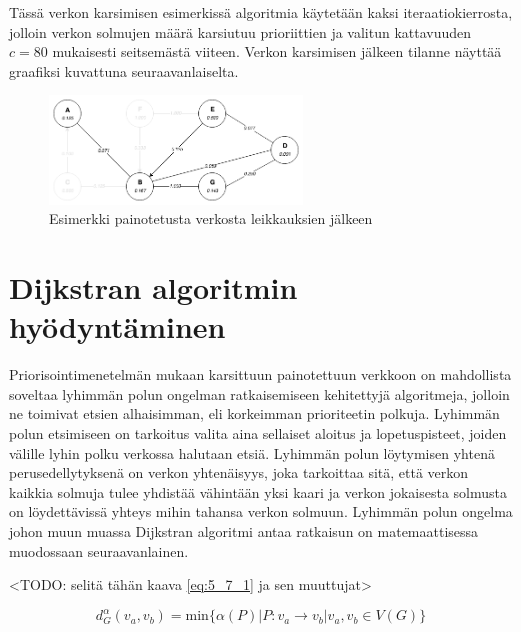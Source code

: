  Tässä verkon karsimisen esimerkissä algoritmia käytetään kaksi iteraatiokierrosta, jolloin verkon solmujen määrä karsiutuu prioriittien ja valitun kattavuuden \(c=80\) mukaisesti seitsemästä viiteen.
  Verkon karsimisen jälkeen tilanne näyttää graafiksi kuvattuna seuraavanlaiselta.

  \begin{figure}[H]
    \centering
    \includegraphics[width=0.6\textwidth]{assets/painotettu-verkko-jalkeen.png}
    \caption{Esimerkki painotetusta verkosta leikkauksien jälkeen}
    \label{fig:painotettu-verkko-jalkeen}
  \end{figure}

\section{Dijkstran algoritmin hyödyntäminen} \label{ch:10_dijkstran_algoritmin_hyodyntaminen}

  Priorisointimenetelmän mukaan karsittuun painotettuun verkkoon on mahdollista soveltaa lyhimmän polun ongelman ratkaisemiseen kehitettyjä algoritmeja, jolloin ne toimivat etsien alhaisimman, eli korkeimman prioriteetin polkuja.
  Lyhimmän polun etsimiseen on tarkoitus valita aina sellaiset aloitus ja lopetuspisteet, joiden välille lyhin polku verkossa halutaan etsiä.
  Lyhimmän polun löytymisen yhtenä perusedellytyksenä on verkon yhtenäisyys, joka tarkoittaa sitä, että verkon kaikkia solmuja tulee yhdistää vähintään yksi kaari ja verkon jokaisesta solmusta on löydettävissä yhteys mihin tahansa verkon solmuun.
  Lyhimmän polun ongelma johon muun muassa Dijkstran algoritmi antaa ratkaisun on matemaattisessa muodossaan seuraavanlainen.

  <TODO: selitä tähän kaava \ref{eq:5_7_1} ja sen muuttujat>

  \begin{equation} \label{eq:5_7_1}
    d_G^\alpha(v_a, v_b) = \text{min}\{\alpha(P) | P:v_a \rightarrow v_b | v_a, v_b \in V(G)\}
  \end{equation}

